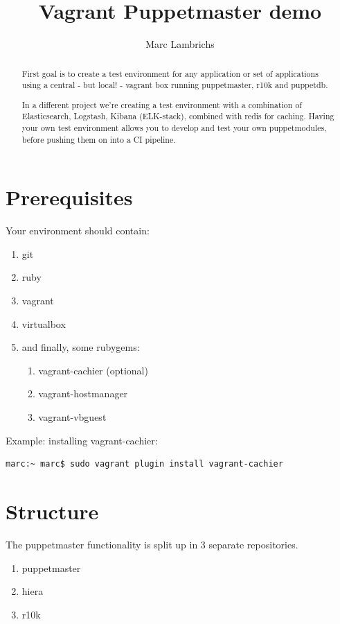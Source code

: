 \documentclass{article}
\begin{document}
\title{Vagrant Puppetmaster demo}
\author{Marc Lambrichs}

\maketitle

\begin{abstract}
First goal is to create a test environment for any application or set of applications using a central - but local! - vagrant box running puppetmaster, r10k and puppetdb.

In a different project we're creating a test environment with a combination of Elasticsearch, Logstash, Kibana (ELK-stack), combined with redis for caching. Having your own test environment allows you to develop and test your own puppetmodules, before pushing them on into a CI pipeline.
\end{abstract}

\section{Prerequisites}
Your environment should contain:
\begin{enumerate}
\item git
\item ruby
\item vagrant
\item virtualbox
\item and finally, some rubygems:
\begin{enumerate}
\item vagrant-cachier (optional)
\item vagrant-hostmanager
\item vagrant-vbguest
\end{enumerate}
\end{enumerate}
Example: installing vagrant-cachier:

\begin{verbatim}
marc:~ marc$ sudo vagrant plugin install vagrant-cachier
\end{verbatim}

\section{Structure}
The puppetmaster functionality is split up in 3 separate repositories.
\begin{enumerate}
\item puppetmaster
\item hiera
\item r10k
\end{enumerate}
\end{document}
